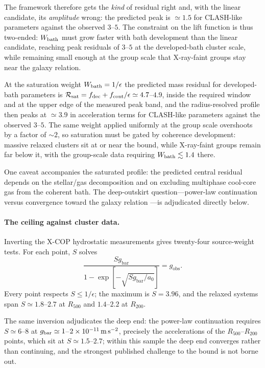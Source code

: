 \documentclass[11pt]{article}
\begin{document}
The framework therefore gets the \emph{kind} of residual right and, with the linear candidate, its \emph{amplitude} wrong: the predicted peak is $\simeq1.5$ for CLASH-like parameters against the observed $3$--$5$. The constraint on the lift function is thus two-ended: $W_{\rm bath}$ must grow faster with bath development than the linear candidate, reaching peak residuals of $3$--$5$ at the developed-bath cluster scale, while remaining small enough at the group scale that X-ray-faint groups stay near the galaxy relation.

At the saturation weight $W_{\rm bath}=1/\epsilon$ the predicted mass residual for developed-bath parameters is $\mathcal R_{\rm sat}=f_{\rm dec}+f_{\rm cont}/\epsilon\simeq4.7$--$4.9$, inside the required window and at the upper edge of the measured peak band, and the radius-resolved profile then peaks at $\simeq3.9$ in acceleration terms for CLASH-like parameters against the observed $3$--$5$. The same weight applied uniformly at the group scale overshoots by a factor of $\sim2$, so saturation must be gated by coherence development: massive relaxed clusters sit at or near the bound, while X-ray-faint groups remain far below it, with the group-scale data requiring $W_{\rm bath}\lesssim1.4$ there.

One caveat accompanies the saturated profile: the predicted central residual depends on the stellar/gas decomposition and on excluding multiphase cool-core gas from the coherent bath. The deep-outskirt question---power-law continuation \citep{Tian2020} versus convergence toward the galaxy relation \citep{Li2023}---is adjudicated directly below.

\paragraph{The ceiling against cluster data.}
Inverting the X-COP hydrostatic measurements \citep{Eckert2019} gives twenty-four source-weight tests. For each point, $S$ solves
\[
\frac{Sg_{\mathrm{bar}}}{1-\exp[-\sqrt{Sg_{\mathrm{bar}}/a_0}]}=g_{\mathrm{obs}}.
\]
Every point respects $S\le1/\epsilon$; the maximum is $S=3.96$, and the relaxed systems span $S\simeq1.8$--$2.7$ at $R_{500}$ and $1.4$--$2.2$ at $R_{200}$.

The same inversion adjudicates the deep end: the power-law continuation requires $S\simeq6$--$8$ at $g_{\rm bar}\simeq1$--$2\times10^{-11}\,{\rm m\,s^{-2}}$, precisely the accelerations of the $R_{500}$--$R_{200}$ points, which sit at $S\simeq1.5$--$2.7$; within this sample the deep end converges rather than continuing, and the strongest published challenge to the bound is not borne out.
\end{document}
